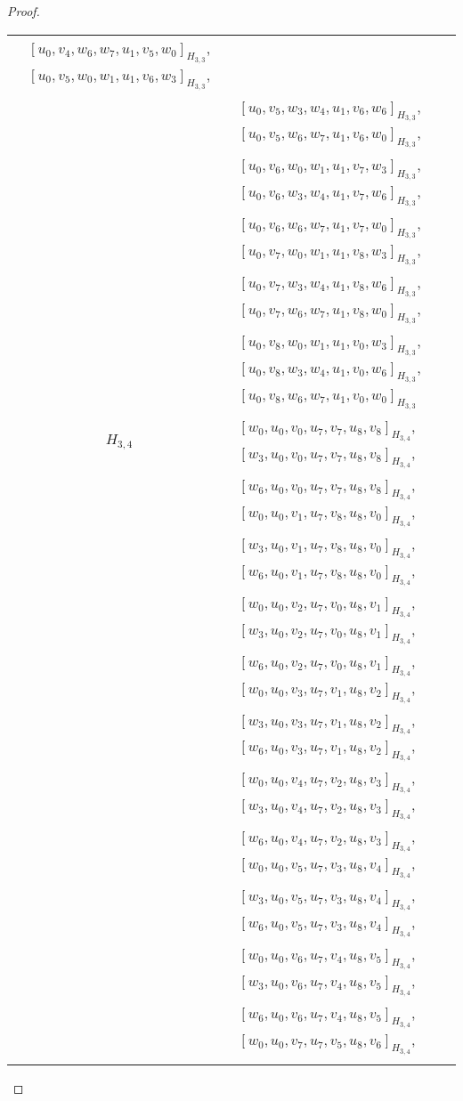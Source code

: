 \begin{subappendices}
\begin{proof}
{\begin{longtable}{|c|l|}
  $[u_0, v_4, w_6, w_7, u_1, v_5, w_0]_{H_{3,3}}$,
  $[u_0, v_5, w_0, w_1, u_1, v_6, w_3]_{H_{3,3}}$, \\* &
  $[u_0, v_5, w_3, w_4, u_1, v_6, w_6]_{H_{3,3}}$,
  $[u_0, v_5, w_6, w_7, u_1, v_6, w_0]_{H_{3,3}}$, \\* &
  $[u_0, v_6, w_0, w_1, u_1, v_7, w_3]_{H_{3,3}}$,
  $[u_0, v_6, w_3, w_4, u_1, v_7, w_6]_{H_{3,3}}$, \\* &
  $[u_0, v_6, w_6, w_7, u_1, v_7, w_0]_{H_{3,3}}$,
  $[u_0, v_7, w_0, w_1, u_1, v_8, w_3]_{H_{3,3}}$, \\* &
  $[u_0, v_7, w_3, w_4, u_1, v_8, w_6]_{H_{3,3}}$,
  $[u_0, v_7, w_6, w_7, u_1, v_8, w_0]_{H_{3,3}}$, \\* &
  $[u_0, v_8, w_0, w_1, u_1, v_0, w_3]_{H_{3,3}}$,
  $[u_0, v_8, w_3, w_4, u_1, v_0, w_6]_{H_{3,3}}$, \\* &
  $[u_0, v_8, w_6, w_7, u_1, v_0, w_0]_{H_{3,3}}$
\\ \hline
$H_{3,4}$ &
  $[w_0, u_0, v_0, u_7, v_7, u_8, v_8]_{H_{3,4}}$,
  $[w_3, u_0, v_0, u_7, v_7, u_8, v_8]_{H_{3,4}}$, \\* &
  $[w_6, u_0, v_0, u_7, v_7, u_8, v_8]_{H_{3,4}}$,
  $[w_0, u_0, v_1, u_7, v_8, u_8, v_0]_{H_{3,4}}$, \\* &
  $[w_3, u_0, v_1, u_7, v_8, u_8, v_0]_{H_{3,4}}$,
  $[w_6, u_0, v_1, u_7, v_8, u_8, v_0]_{H_{3,4}}$, \\* &
  $[w_0, u_0, v_2, u_7, v_0, u_8, v_1]_{H_{3,4}}$,
  $[w_3, u_0, v_2, u_7, v_0, u_8, v_1]_{H_{3,4}}$, \\* &
  $[w_6, u_0, v_2, u_7, v_0, u_8, v_1]_{H_{3,4}}$,
  $[w_0, u_0, v_3, u_7, v_1, u_8, v_2]_{H_{3,4}}$, \\* &
  $[w_3, u_0, v_3, u_7, v_1, u_8, v_2]_{H_{3,4}}$,
  $[w_6, u_0, v_3, u_7, v_1, u_8, v_2]_{H_{3,4}}$, \\* &
  $[w_0, u_0, v_4, u_7, v_2, u_8, v_3]_{H_{3,4}}$,
  $[w_3, u_0, v_4, u_7, v_2, u_8, v_3]_{H_{3,4}}$, \\* &
  $[w_6, u_0, v_4, u_7, v_2, u_8, v_3]_{H_{3,4}}$,
  $[w_0, u_0, v_5, u_7, v_3, u_8, v_4]_{H_{3,4}}$, \\* &
  $[w_3, u_0, v_5, u_7, v_3, u_8, v_4]_{H_{3,4}}$,
  $[w_6, u_0, v_5, u_7, v_3, u_8, v_4]_{H_{3,4}}$, \\* &
  $[w_0, u_0, v_6, u_7, v_4, u_8, v_5]_{H_{3,4}}$,
  $[w_3, u_0, v_6, u_7, v_4, u_8, v_5]_{H_{3,4}}$, \\* &
  $[w_6, u_0, v_6, u_7, v_4, u_8, v_5]_{H_{3,4}}$,
  $[w_0, u_0, v_7, u_7, v_5, u_8, v_6]_{H_{3,4}}$, \\* &

\end{longtable}}
\end{proof}
\end{subappendices}
